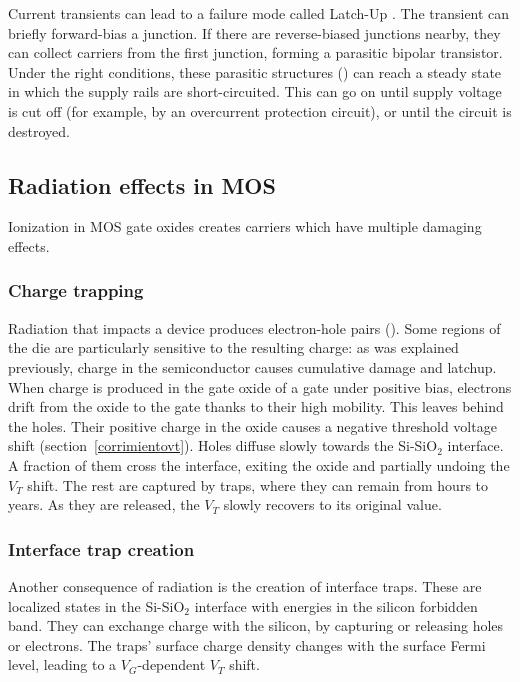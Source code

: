 Current transients can lead to a failure mode called Latch-Up
\cite{gregory_latch-up_1973}.
The transient can briefly forward-bias a junction.
If there are reverse-biased junctions nearby,
they can collect carriers from the first junction,
forming a parasitic bipolar transistor.
Under the right conditions,
these parasitic structures ()
can reach a steady state in which
the supply rails are short-circuited.
This can go on until supply voltage is cut off
(for example, by an overcurrent protection circuit),
or until the circuit is destroyed.
\subsection{Radiation effects in MOS}
Ionization in MOS gate oxides creates carriers which
have multiple damaging effects. 
\subsubsection{Charge trapping}
Radiation that impacts a device produces electron-hole pairs ().
Some regions of the die are particularly sensitive to the resulting charge:
as was explained previously,
charge in the semiconductor causes cumulative damage and latchup.
When charge is produced in the gate oxide of a gate under positive bias,
electrons drift from the oxide to the gate thanks to their high mobility.
This leaves behind the holes.
Their positive charge in the oxide causes a negative threshold voltage shift
(section~\ref{corrimientovt}).
Holes diffuse slowly towards the Si-SiO$_2$ interface.
A fraction of them cross the interface,
exiting the oxide and partially undoing the $V_T$ shift.
The rest are captured by traps,
where they can remain from hours to years.
As they are released,
the $V_T$ slowly recovers to its original value.
\subsubsection{Interface trap creation}
Another consequence of radiation is the creation of interface traps.
These are localized states in the Si-SiO$_2$ interface
with energies in the silicon forbidden band.
They can exchange charge with the silicon,
by capturing or releasing holes or electrons.
The traps' surface charge density changes with the surface Fermi level,
leading to a $V_G$-dependent $V_T$ shift.
